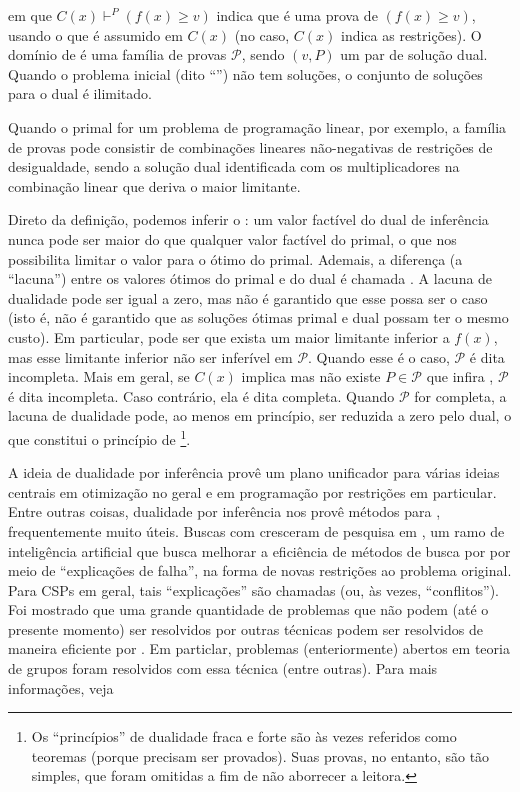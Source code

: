 \noindent em que $C(x) \vdash^{P} (f(x) \geq v)$ indica que  é uma prova de $(f(x) \geq v)$,
usando o que é assumido em $C(x)$ (no caso, $C(x)$ indica as restrições). O domínio de  é uma família de provas $\mathcal{P}$, sendo
$(v,P)$ um par de solução dual. Quando o problema inicial (dito ``'') não tem
soluções, o conjunto de soluções para o dual é ilimitado.

Quando o primal for um problema de programação linear, por exemplo, a família de provas pode
consistir de combinações lineares não-negativas de restrições de desigualdade, sendo a solução dual
identificada com os multiplicadores na combinação linear que deriva o maior limitante.

Direto da definição, podemos inferir o : um valor factível
 do dual de inferência nunca pode ser maior do que qualquer valor factível do primal, o que
nos possibilita limitar o valor para o ótimo do primal.
Ademais, a diferença (a ``lacuna'') entre os valores ótimos do primal e do dual é chamada
. A lacuna de dualidade pode ser igual a zero, mas não é garantido
que esse possa ser o caso (isto é, não é garantido que as soluções ótimas primal e dual possam ter o
mesmo custo). Em particular, pode ser que exista um maior limitante inferior a $f(x)$, mas
esse limitante inferior não ser inferível em $\mathcal{P}$. Quando esse é o caso, $\mathcal{P}$ é
dita incompleta. Mais em geral, se $C(x)$ implica  mas não existe $P \in
\mathcal{P}$ que infira , $\mathcal{P}$ é dita incompleta. Caso contrário, ela é dita
completa. Quando $\mathcal{P}$ for completa, a lacuna de dualidade pode, ao menos em princípio, ser
reduzida a zero pelo dual, o que
constitui o princípio de \footnote{Os ``princípios'' de dualidade fraca e
  forte são às vezes referidos como teoremas (porque precisam ser provados). Suas provas, no
  entanto, são tão simples, que foram omitidas a fim de não aborrecer a leitora.}.

A ideia de dualidade por inferência provê um plano unificador para várias ideias centrais em
otimização no geral e em programação por restrições em particular. Entre outras coisas, dualidade
por inferência nos provê métodos para , frequentemente muito
úteis. Buscas com  cresceram de pesquisa em
, um ramo de inteligência artificial que busca melhorar
a eficiência de métodos de busca por  por meio de ``explicações de falha'',
na forma de novas restrições ao problema original. Para CSPs em geral, tais ``explicações'' são
chamadas  (ou, às vezes, ``conflitos''). Foi mostrado que uma grande quantidade de
problemas que não podem (até o presente momento) ser resolvidos por outras técnicas podem ser
resolvidos de maneira eficiente por . Em particlar, problemas
(enteriormente) abertos em teoria de grupos foram resolvidos com essa técnica (entre outras). Para
mais informações, veja \cite{beame}


